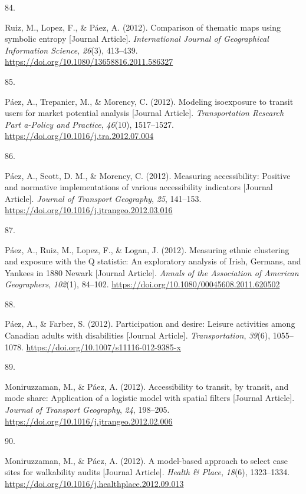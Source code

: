 \documentclass[11pt,a4paper,]{awesome-cv}
\newlength{\cslhangindent}
\newlength{\csllabelwidth}
\newenvironment{CSLReferences}[2] %
 {\begin{list}{}{%
  \setlength{\itemindent}{0pt}
  \setlength{\leftmargin}{0pt}
  \setlength{\parsep}{0pt}
  \ifodd #1
   \setlength{\leftmargin}{\cslhangindent}
   \setlength{\itemindent}{-1\cslhangindent}
  \fi
  \setlength{\itemsep}{#2\baselineskip}}}
 {\end{list}}
\newcommand{\CSLLeftMargin}[1]{\parbox[t]{\csllabelwidth}{\strut#1\strut}}
\newcommand{\CSLRightInline}[1]{\parbox[t]{\linewidth - \csllabelwidth}{\strut#1\strut}}
\begin{document}
\begin{CSLReferences}{0}{0}
\CSLLeftMargin{84. }%
\CSLRightInline{Ruiz, M., Lopez, F., \& Páez, A. (2012). Comparison of
thematic maps using symbolic entropy {[}Journal Article{]}.
\emph{International Journal of Geographical Information Science},
\emph{26}(3), 413--439.
\url{https://doi.org/10.1080/13658816.2011.586327}}

\CSLLeftMargin{85. }%
\CSLRightInline{Páez, A., Trepanier, M., \& Morency, C. (2012). Modeling
isoexposure to transit users for market potential analysis {[}Journal
Article{]}. \emph{Transportation Research Part a-Policy and Practice},
\emph{46}(10), 1517--1527.
\url{https://doi.org/10.1016/j.tra.2012.07.004}}

\CSLLeftMargin{86. }%
\CSLRightInline{Páez, A., Scott, D. M., \& Morency, C. (2012). Measuring
accessibility: Positive and normative implementations of various
accessibility indicators {[}Journal Article{]}. \emph{Journal of
Transport Geography}, \emph{25}, 141--153.
\url{https://doi.org/10.1016/j.jtrangeo.2012.03.016}}

\CSLLeftMargin{87. }%
\CSLRightInline{Páez, A., Ruiz, M., Lopez, F., \& Logan, J. (2012).
Measuring ethnic clustering and exposure with the Q statistic: An
exploratory analysis of Irish, Germans, and Yankees in 1880 Newark
{[}Journal Article{]}. \emph{Annals of the Association of American
Geographers}, \emph{102}(1), 84--102.
\url{https://doi.org/10.1080/00045608.2011.620502}}

\CSLLeftMargin{88. }%
\CSLRightInline{Páez, A., \& Farber, S. (2012). Participation and
desire: Leisure activities among Canadian adults with disabilities
{[}Journal Article{]}. \emph{Transportation}, \emph{39}(6), 1055--1078.
\url{https://doi.org/10.1007/s11116-012-9385-x}}

\CSLLeftMargin{89. }%
\CSLRightInline{Moniruzzaman, M., \& Páez, A. (2012). Accessibility to
transit, by transit, and mode share: Application of a logistic model
with spatial filters {[}Journal Article{]}. \emph{Journal of Transport
Geography}, \emph{24}, 198--205.
\url{https://doi.org/10.1016/j.jtrangeo.2012.02.006}}

\CSLLeftMargin{90. }%
\CSLRightInline{Moniruzzaman, M., \& Páez, A. (2012). A model-based
approach to select case sites for walkability audits {[}Journal
Article{]}. \emph{Health \& Place}, \emph{18}(6), 1323--1334.
\url{https://doi.org/10.1016/j.healthplace.2012.09.013}}


\end{CSLReferences}
\end{document}
